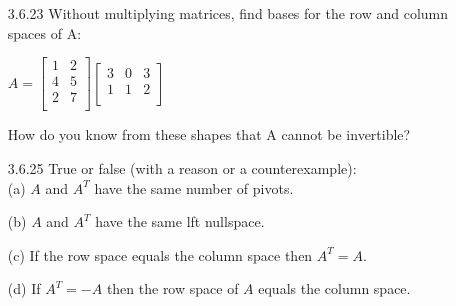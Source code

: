 \documentclass[10pt,twoside,reqno]{article}
\begin{document}
\begin{enumerate}
\item[3.6.23] Without multiplying matrices, find bases for the row and column spaces of A:\\
\begin{center}
$
$$
A =
\begin{bmatrix}
1&2\\
4&5\\
2&7\\
\end{bmatrix}
\begin{bmatrix}
3&0&3\\
1&1&2\\
\end{bmatrix}
$$
$\\
\end{center}
How do you know from these shapes that A cannot be invertible?\\
\vspace{3mm}



\item[3.6.25] True or false (with a reason or a counterexample):\\
(a) $A$ and $A^T$ have the same number of pivots.\\
\vspace{3mm}



(b) $A$ and $A^T$ have the same lft nullspace.\\
\vspace{3mm}



(c) If the row space equals the column space then $A^T = A$.\\
\vspace{3mm}



(d) If $A^T = -A$ then the row space of $A$ equals the column space.\\
\vspace{3mm}




\end{enumerate}
\end{document}
